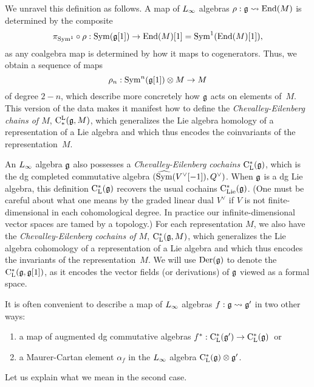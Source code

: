 We unravel this definition as follows.
A map of $\L8$ algebras $\rho: \fg \l8to \End(M)$ is determined by the composite 
\[
\pi_{{\rm Sym}^1} \circ \rho: {\rm Sym}(\mathfrak g[1]) \to {\rm End}(M)[1] = {\rm Sym}^1({\rm End}(M)[1]),
\]
as any coalgebra map is determined by how it maps to cogenerators.
Thus, we obtain a sequence of maps
\[
\rho_n: {\rm Sym}^n(\mathfrak g[1]) \otimes M \to M
\]
of degree $2-n$, which describe more concretely how $\mathfrak g$ acts on elements of~$M$.
This version of the data makes it manifest how to define the {\em Chevalley-Eilenberg chains of $M$},
${\rm C}^{\rm L}_*(\mathfrak g,M)$, which generalizes the Lie algebra homology of a representation of a Lie algebra
and which thus encodes the coinvariants of the representation~$M$.

An $\L8$ algebra $\mathfrak g$ also possesses a {\em Chevalley-Eilenberg cochains} ${\rm C}_{\rm L}^*(\mathfrak g)$, 
which is the dg completed commutative algebra $(\widehat{{\rm Sym}}(V^\vee[-1]),Q^\vee)$.
When $\mathfrak g$ is a dg Lie algebra, this definition ${\rm C}_{\rm L}^*(\mathfrak g)$ recovers the usual cochains ${\rm C}_{\rm Lie}^*(\mathfrak g)$.
(One must be careful about what one means by the graded linear dual $V^\vee$
if $V$ is not finite-dimensional in each cohomological degree.
In practice our infinite-dimensional vector spaces are tamed by a topology.)
For each representation $M$, we also have the {\em Chevalley-Eilenberg cochains of $M$},
${\rm C}_{\rm L}^*(\mathfrak g,M)$, which generalizes the Lie algebra cohomology of a representation of a Lie algebra
and which thus encodes the invariants of the representation~$M$.
We will use ${\rm Der}(\mathfrak g)$ to denote the ${\rm C}_{\rm L}^*(\mathfrak g,\mathfrak g[1])$, 
as it encodes the vector fields (or derivations) of $\mathfrak g$ viewed as a formal space.

It is often convenient to describe a map of $\L8$ algebras $f: \fg \l8to \fg'$ in two other ways:
\begin{enumerate}
\item a map of augmented dg commutative algebras $f^*: {\rm C}_{\rm L}^*(\mathfrak g') \to {\rm C}_{\rm L}^*(\mathfrak g)$~or
\item a Maurer-Cartan element $\alpha_f$ in the $\L8$ algebra ${\rm C}_{\rm L}^*(\mathfrak g) \otimes \mathfrak g'$.
\end{enumerate}
Let us explain what we mean in the second case.

